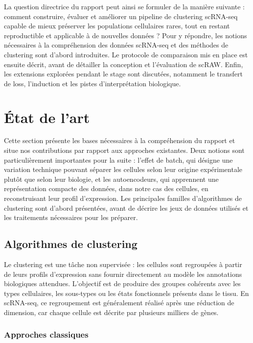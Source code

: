 La question directrice du rapport peut ainsi se formuler de la manière suivante : comment construire, évaluer et améliorer un pipeline de clustering scRNA-seq capable de mieux préserver les populations cellulaires rares, tout en restant reproductible et applicable à de nouvelles données ? Pour y répondre, les notions nécessaires à la compréhension des données scRNA-seq et des méthodes de clustering sont d'abord introduites. Le protocole de comparaison mis en place est ensuite décrit, avant de détailler la conception et l'évaluation de scRAW. Enfin, les extensions explorées pendant le stage sont discutées, notamment le transfert de loss, l'induction et les pistes d'interprétation biologique.

\section{État de l'art}

Cette section présente les bases nécessaires à la compréhension du rapport et situe nos contributions par rapport aux approches existantes. Deux notions sont particulièrement importantes pour la suite : l'effet de batch, qui désigne une variation technique pouvant séparer les cellules selon leur origine expérimentale plutôt que selon leur biologie, et les autoencodeurs, qui apprennent une représentation compacte des données, dans notre cas des cellules, en reconstruisant leur profil d'expression. Les principales familles d'algorithmes de clustering sont d'abord présentées, avant de décrire les jeux de données utilisés et les traitements nécessaires pour les préparer.

\subsection{Algorithmes de clustering}

Le clustering est une tâche non supervisée : les cellules sont regroupées à partir de leurs profils d'expression sans fournir directement au modèle les annotations biologiques attendues. L'objectif est de produire des groupes cohérents avec les types cellulaires, les sous-types ou les états fonctionnels présents dans le tissu. En scRNA-seq, ce regroupement est généralement réalisé après une réduction de dimension, car chaque cellule est décrite par plusieurs milliers de gènes.

\subsubsection{Approches classiques}

